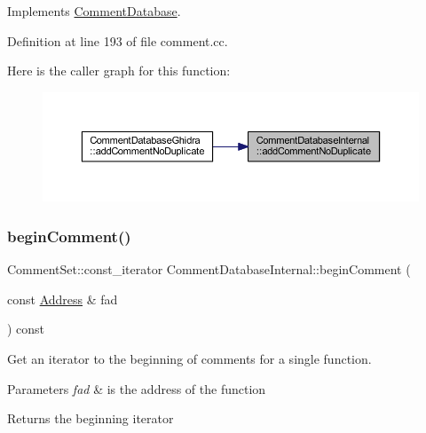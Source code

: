Implements \mbox{\hyperlink{class_comment_database_a41b306ed1b9ac26a4b2c80a927be3364}{Comment\+Database}}.



Definition at line 193 of file comment.\+cc.

Here is the caller graph for this function\+:
\nopagebreak
\begin{figure}[H]
\begin{center}
\leavevmode
\includegraphics[width=350pt]{class_comment_database_internal_af3ba80fc4fd50954903bf2d0c54f36a8_icgraph}
\end{center}
\end{figure}
\mbox{\label{class_comment_database_internal_a23097880c0ad74fdbe692772957844f6}} 
\subsubsection{\texorpdfstring{beginComment()}{beginComment()}}
{\footnotesize\ttfamily Comment\+Set\+::const\+\_\+iterator Comment\+Database\+Internal\+::begin\+Comment (\begin{DoxyParamCaption}\item[{const \mbox{\hyperlink{class_address}{Address}} \&}]{fad }\end{DoxyParamCaption}) const\hspace{0.3cm}{\ttfamily [virtual]}}



Get an iterator to the beginning of comments for a single function. 


\begin{DoxyParams}{Parameters}
{\em fad} & is the address of the function \\
\hline
\end{DoxyParams}
\begin{DoxyReturn}{Returns}
the beginning iterator 
\end{DoxyReturn}


